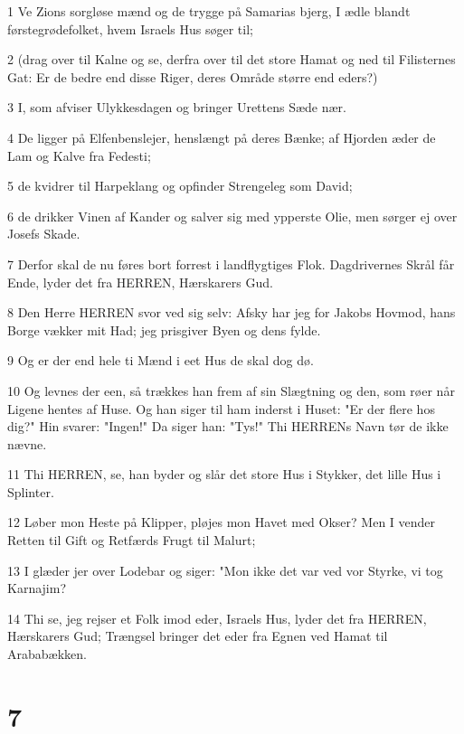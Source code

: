 \par 1 Ve Zions sorgløse mænd og de trygge på Samarias bjerg, I ædle blandt førstegrødefolket, hvem Israels Hus søger til;
\par 2 (drag over til Kalne og se, derfra over til det store Hamat og ned til Filisternes Gat: Er de bedre end disse Riger, deres Område større end eders?)
\par 3 I, som afviser Ulykkesdagen og bringer Urettens Sæde nær.
\par 4 De ligger på Elfenbenslejer, henslængt på deres Bænke; af Hjorden æder de Lam og Kalve fra Fedesti;
\par 5 de kvidrer til Harpeklang og opfinder Strengeleg som David;
\par 6 de drikker Vinen af Kander og salver sig med ypperste Olie, men sørger ej over Josefs Skade.
\par 7 Derfor skal de nu føres bort forrest i landflygtiges Flok. Dagdrivernes Skrål får Ende, lyder det fra HERREN, Hærskarers Gud.
\par 8 Den Herre HERREN svor ved sig selv: Afsky har jeg for Jakobs Hovmod, hans Borge vækker mit Had; jeg prisgiver Byen og dens fylde.
\par 9 Og er der end hele ti Mænd i eet Hus de skal dog dø.
\par 10 Og levnes der een, så trækkes han frem af sin Slægtning og den, som røer når Ligene hentes af Huse. Og han siger til ham inderst i Huset: "Er der flere hos dig?" Hin svarer: "Ingen!" Da siger han: "Tys!" Thi HERRENs Navn tør de ikke nævne.
\par 11 Thi HERREN, se, han byder og slår det store Hus i Stykker, det lille Hus i Splinter.
\par 12 Løber mon Heste på Klipper, pløjes mon Havet med Okser? Men I vender Retten til Gift og Retfærds Frugt til Malurt;
\par 13 I glæder jer over Lodebar og siger: "Mon ikke det var ved vor Styrke, vi tog Karnajim?
\par 14 Thi se, jeg rejser et Folk imod eder, Israels Hus, lyder det fra HERREN, Hærskarers Gud; Trængsel bringer det eder fra Egnen ved Hamat til Arababækken.

\chapter{7}

